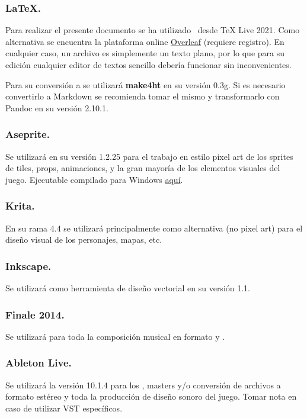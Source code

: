 \subsubsection{LaTeX.}
Para realizar el presente documento se ha utilizado \LaTeXe\ desde TeX Live 2021. Como alternativa se encuentra la plataforma online \href{https://www.overleaf.com/}{Overleaf} (requiere registro). En cualquier caso, un archivo  es simplemente un texto plano, por lo que para su edición cualquier editor de textos sencillo debería funcionar sin inconvenientes.

Para su conversión a  se utilizará \textbf{make4ht} en su versión 0.3g. Si es necesario convertirlo a Markdown se recomienda tomar el mismo  y transformarlo con Pandoc en su versión 2.10.1.

\subsubsection{Aseprite.}
Se utilizará en su versión 1.2.25 para el trabajo en estilo pixel art de los sprites de tiles, props, animaciones,  y la gran mayoría de los elementos visuales del juego. Ejecutable compilado para Windows \href{https://drive.google.com/drive/folders/1DPhGeg7WzV9j81u3B5isgsXqoMtfd_Uv?usp=sharing}{aquí}.

\subsubsection{Krita.}
En su rama 4.4 se utilizará principalmente como alternativa (no pixel art) para el diseño visual de los personajes, mapas, etc.

\subsubsection{Inkscape.}
Se utilizará como herramienta de diseño vectorial en su versión 1.1.

\subsubsection{Finale 2014.}
Se utilizará para toda la composición musical en formato  y .

\subsubsection{Ableton Live.}
Se utilizará la versión 10.1.4 para los , masters y/o conversión de archivos  a formato  estéreo y toda la producción de diseño sonoro del juego. Tomar nota en caso de utilizar VST específicos.


